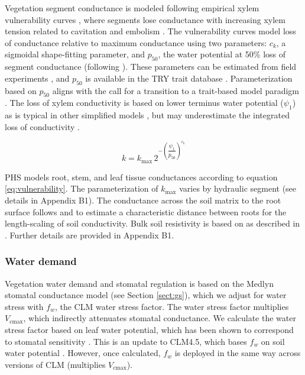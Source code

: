 \documentclass[draft,linenumbers]{agujournal}
\begin{document}
     Vegetation segment conductance is modeled following empirical xylem vulnerability curves \citep{tyree1989}, 
     where segments lose conductance with increasing xylem tension related to 
     cavitation and embolism \citep{holbrook2001}.
     The vulnerability curves model loss of conductance relative to maximum conductance using two parameters: 
     $c_k$, a sigmoidal shape-fitting parameter, and 
     $p_{50}$, the water potential at 50\% loss of segment conductance (following \cite{gentine2016}). 
     These parameters can be estimated from field experiments \citep{sack2002}, 
     and $p_{50}$ is available in the TRY trait database \citep{kattge2011}.
     Parameterization based on $p_{50}$ aligns with the call for a transition to a
     trait-based model paradigm \citep{anderegg2015a}.
     The loss of xylem conductivity is based on lower terminus water potential ($\psi_1$)
     as is typical in other simplified models \citep{xu2016}, but 
     may underestimate the integrated loss of conductivity \citep{sperry2015}. 
         
     \begin{linenomath*}
     \begin{equation}
     \label{eq:vulnerability}
     k = k_{\text{max}} \, 2^{-\left(\dfrac{\psi_1}{p_{50}}\right)^{c_k}}
     \end{equation}
     \end{linenomath*}
     
     PHS models root, stem, and leaf tissue conductances according to equation \ref{eq:vulnerability}.
     The parameterization of $k_{\text{max}}$ varies by hydraulic segment (see details in Appendix B1).
     The conductance across the soil matrix to the root surface follows \citet{williams2001} and \citet{bonan2014} 
     to estimate a characteristic distance between roots for the length-scaling of soil conductivity.
     Bulk soil resistivity is based on \citet{clapp1978} as described in \citet{oleson2013}.
     Further details are provided in Appendix B1.
    
    \subsubsection{Water demand}
    \label{sect:demand}
    
    Vegetation water demand and stomatal regulation is based on the Medlyn stomatal conductance model (see Section \ref{sect:gs}), 
    which we adjust for water stress with $f_w$, the CLM water stress factor. 
    The water stress factor multiplies $V_{\text{cmax}}$, which indirectly attenuates stomatal conductance.
    We calculate the water stress factor based on leaf water potential, which has been shown to correspond to stomatal sensitivity \citep{klein2014}.
    This is an update to CLM4.5, which bases $f_w$ on soil water potential \citep{oleson2013}.
    However, once calculated, $f_w$ is deployed in the same way across versions of CLM (multiplies $V_{\text{cmax}}$).
\end{document}
